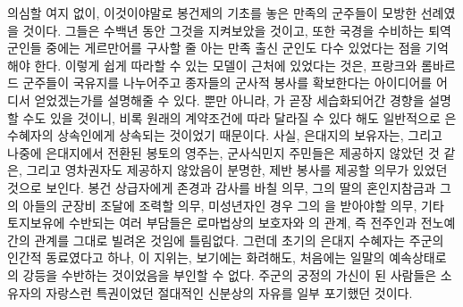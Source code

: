 의심할 여지 없이,
이것이야말로
봉건제의 기초를 놓은
만족의 군주들이 모방한 선례였을 것이다.
그들은 수백년 동안 그것을 지켜보았을 것이고,
또한 국경을 수비하는 퇴역 군인들 중에는
게르만어를 구사할 줄 아는 만족 출신 군인도 다수 있었다는 점을
기억해야 한다.
이렇게 쉽게 따라할 수 있는 모델이 근처에 있었다는 것은,
프랑크와 롬바르드 군주들이
국유지를 나누어주고 종자들의 군사적 봉사를 확보한다는
아이디어를 어디서 얻었겠는가를
설명해줄 수 있다.
뿐만 아니라,
가
곧장 세습화되어간
경향을
설명할 수도 있을 것이니,
비록 원래의 계약조건에 따라 달라질 수 있다 해도
일반적으로 은 수혜자의 상속인에게 상속되는 것이었기 때문이다.
사실,
은대지의 보유자는,
그리고 나중에 은대지에서 전환된 봉토의 영주는,
군사식민지 주민들은 제공하지 않았던 것 같은,
그리고 영차권자도 제공하지 않았음이 분명한,
제반 봉사를
제공할 의무가 있었던 것으로 보인다.
봉건 상급자에게 존경과 감사를 바칠 의무,
그의 딸의 혼인지참금과 그의 아들의 군장비 조달에 조력할 의무,
미성년자인 경우 그의 을 받아야할 의무,
기타 토지보유에 수반되는 여러 부담들은
로마법상의 보호자와 의 관계,
즉 전주인과 전노예 간의 관계를
그대로 빌려온 것임에 틀림없다.
그런데 초기의 은대지 수혜자는
주군의 인간적 동료였다고 하나,
이 지위는,
보기에는 화려해도,
처음에는 일말의 예속상태로의 강등을 수반하는 것이었음을
부인할 수 없다.
주군의 궁정의 가신이 된 사람들은
 소유자의 자랑스런 특권이었던
절대적인 신분상의 자유를 일부 포기했던 것이다.

